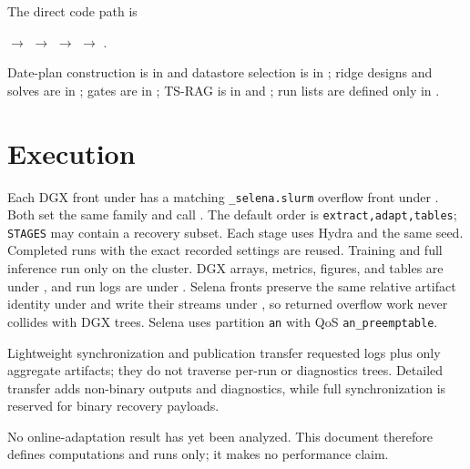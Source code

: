 \documentclass[11pt]{article}
\begin{document}
The direct code path is
\begin{center}
\small
{} $\longrightarrow$
 $\longrightarrow$
 $\longrightarrow$
 $\longrightarrow$
.
\end{center}
Date-plan construction is in  and datastore
selection is in ; ridge designs and solves
are in ; gates are in
; TS-RAG is in
 and ; run lists are
defined only in .

\section{Execution}

Each DGX front under  has a matching
\texttt{\_selena.slurm} overflow front under . Both set
the same family and call
. The default order is
\texttt{extract,adapt,tables}; \texttt{STAGES} may contain a recovery subset.
Each stage uses Hydra and the same seed. Completed runs with the exact recorded
settings are reused. Training and full inference run only on the cluster.
DGX arrays, metrics, figures, and tables are under , and run
logs are under . Selena fronts preserve the same relative artifact
identity under  and write their streams under
, so returned overflow work never collides with DGX trees.
Selena uses partition \texttt{an} with QoS \texttt{an\_preemptable}.

Lightweight synchronization and publication transfer requested logs plus only
aggregate  artifacts; they do not traverse per-run or
diagnostics trees. Detailed transfer adds non-binary outputs and diagnostics,
while full synchronization is reserved for binary recovery payloads.

No online-adaptation result has yet been analyzed. This document therefore
defines computations and runs only; it makes no performance claim.
\end{document}
